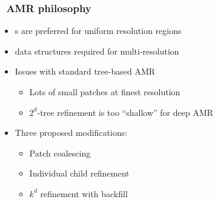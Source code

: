 \begin{frame}[fragile] \frametitle{\cello\ AMR philosophy}
\begin{itemize}
\item {}s are preferred for uniform resolution regions
\item {} data structures required for multi-resolution
\item Issues with standard tree-based AMR
\begin{itemize}
\item Lots of small patches at finest resolution
\item $2^d$-tree refinement is too ``shallow'' for deep AMR
\end{itemize}
\item Three proposed modifications:
\begin{itemize}
\item Patch coalescing
\item Individual child refinement
\item $k^d$ refinement with backfill
\end{itemize}
\end{itemize}
\end{frame}


